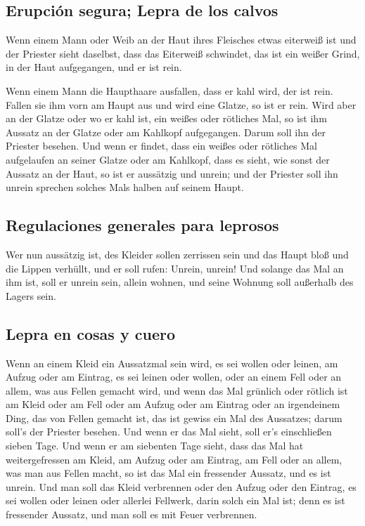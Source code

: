 \hypertarget{erupciuxf3n-segura-lepra-de-los-calvos}{%
\subsection{Erupción segura; Lepra de los
calvos}\label{erupciuxf3n-segura-lepra-de-los-calvos}}

 Wenn einem Mann oder Weib an der Haut ihres Fleisches
etwas eiterweiß ist  und der Priester sieht daselbst,
dass das Eiterweiß schwindet, das ist ein weißer Grind, in der Haut
aufgegangen, und er ist rein.

 Wenn einem Mann die Haupthaare ausfallen, dass er kahl
wird, der ist rein.  Fallen sie ihm vorn am Haupt aus und
wird eine Glatze, so ist er rein.  Wird aber an der
Glatze oder wo er kahl ist, ein weißes oder rötliches Mal, so ist ihm
Aussatz an der Glatze oder am Kahlkopf aufgegangen. 
Darum soll ihn der Priester besehen. Und wenn er findet, dass ein weißes
oder rötliches Mal aufgelaufen an seiner Glatze oder am Kahlkopf, dass
es sieht, wie sonst der Aussatz an der Haut,  so ist er
aussätzig und unrein; und der Priester soll ihn unrein sprechen solches
Mals halben auf seinem Haupt.

\hypertarget{regulaciones-generales-para-leprosos}{%
\subsection{Regulaciones generales para
leprosos}\label{regulaciones-generales-para-leprosos}}

 Wer nun aussätzig ist, des Kleider sollen zerrissen sein
und das Haupt bloß und die Lippen verhüllt, und er soll rufen: Unrein,
unrein!  Und solange das Mal an ihm ist, soll er unrein
sein, allein wohnen, und seine Wohnung soll außerhalb des Lagers sein.

\hypertarget{lepra-en-cosas-y-cuero}{%
\subsection{Lepra en cosas y cuero}\label{lepra-en-cosas-y-cuero}}

 Wenn an einem Kleid ein Aussatzmal sein wird, es sei
wollen oder leinen,  am Aufzug oder am Eintrag, es sei
leinen oder wollen, oder an einem Fell oder an allem, was aus Fellen
gemacht wird,  und wenn das Mal grünlich oder rötlich ist
am Kleid oder am Fell oder am Aufzug oder am Eintrag oder an irgendeinem
Ding, das von Fellen gemacht ist, das ist gewiss ein Mal des Aussatzes;
darum soll's der Priester besehen.  Und wenn er das Mal
sieht, soll er's einschließen sieben Tage.  Und wenn er
am siebenten Tage sieht, dass das Mal hat weitergefressen am Kleid, am
Aufzug oder am Eintrag, am Fell oder an allem, was man aus Fellen macht,
so ist das Mal ein fressender Aussatz, und es ist unrein.
 Und man soll das Kleid verbrennen oder den Aufzug oder
den Eintrag, es sei wollen oder leinen oder allerlei Fellwerk, darin
solch ein Mal ist; denn es ist fressender Aussatz, und man soll es mit
Feuer verbrennen.


